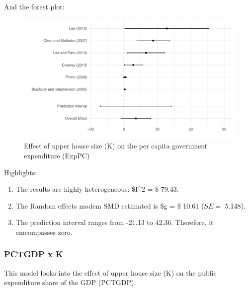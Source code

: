 \documentclass[
]{article}
\providecommand{\tightlist}{%
  \setlength{\itemsep}{0pt}\setlength{\parskip}{0pt}}
\begin{document}
And the forest plot:

\begin{figure}
\centering
\includegraphics{appendixV5_files/figure-latex/unnamed-chunk-27-1.pdf}
\caption{Effect of upper house size (K) on the per capita government
expenditure (ExpPC)}
\end{figure}

Highlights:

\begin{enumerate}
\def\labelenumi{\arabic{enumi}.}
\tightlist
\item
  The results are highly heterogeneous: \$I\^{}2 = \$ 79.43.
\item
  The Random effects modem SMD estimated is \$g = \$ 10.61 (\(SE =\)
  5.148).
\item
  The prediction interval ranges from -21.13 to 42.36. Therefore, it
  emcompasses zero.
\end{enumerate}

\newpage

\hypertarget{pctgdp-x-k}{%
\subsubsection{PCTGDP x K}\label{pctgdp-x-k}}

This model looks into the effect of upper house size (K) on the public
expenditure share of the GDP (PCTGDP).
\end{document}
